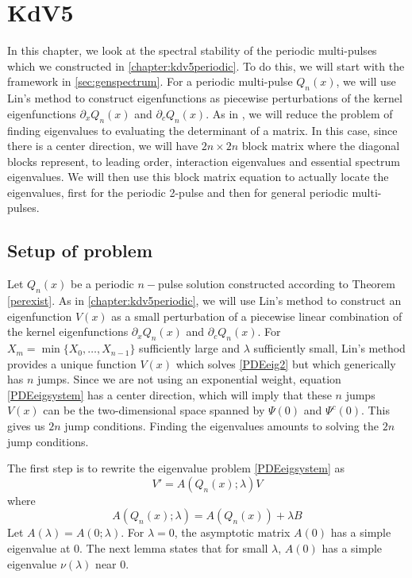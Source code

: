 \documentclass[thesis.tex]{subfiles}
\begin{document}
\iffulldocument\else
	\chapter{KdV5}
\fi

In this chapter, we look at the spectral stability of the periodic multi-pulses which we constructed in \cref{chapter:kdv5periodic}. To do this, we will start with the framework in \cref{sec:genspectrum}. For a periodic multi-pulse $Q_n(x)$, we will use Lin's method to construct eigenfunctions as piecewise perturbations of the kernel eigenfunctions $\partial_x Q_n(x)$ and $\partial_c Q_n(x)$. As in \cite{Sandstede1998}, we will reduce the problem of finding eigenvalues to evaluating the determinant of a matrix. In this case, since there is a center direction, we will have $2n \times 2n$ block matrix where the diagonal blocks represent, to leading order, interaction eigenvalues and essential spectrum eigenvalues. We will then use this block matrix equation to actually locate the eigenvalues, first for the periodic 2-pulse and then for general periodic multi-pulses.

\section{Setup of problem}

Let $Q_n(x)$ be a periodic $n-$pulse solution constructed according to Theorem \ref{perexist}. As in \cref{chapter:kdv5periodic}, we will use Lin's method to construct an eigenfunction $V(x)$ as a small perturbation of a piecewise linear combination of the kernel eigenfunctions $\partial_x Q_n(x)$ and $\partial_c Q_n(x)$. For $X_m = \min\{X_0, \dots, X_{n-1} \}$ sufficiently large and $\lambda$ sufficiently small, Lin's method provides a unique function $V(x)$ which solves \eqref{PDEeig2} but which generically has $n$ jumps. Since we are not using an exponential weight, equation \cref{PDEeigsystem} has a center direction, which will imply that these $n$ jumps $V(x)$ can be the two-dimensional space spanned by $\Psi(0)$ and $\Psi^c(0)$. This gives us $2n$ jump conditions. Finding the eigenvalues amounts to solving the $2n$ jump conditions.
 
The first step is to rewrite the eigenvalue problem \cref{PDEeigsystem} as
\begin{equation}\label{PDEeig3}
V' = A(Q_n(x); \lambda)V 
\end{equation} 
where 
\begin{equation}
A(Q_n(x); \lambda) = A(Q_n(x)) + \lambda B
\end{equation}
Let $A(\lambda) = A(0; \lambda)$. For $\lambda = 0$, the asymptotic matrix $A(0)$ has a simple eigenvalue at 0. The next lemma states that for small $\lambda$, $A(0)$ has a simple eigenvalue $\nu(\lambda)$ near 0.
\end{document}
